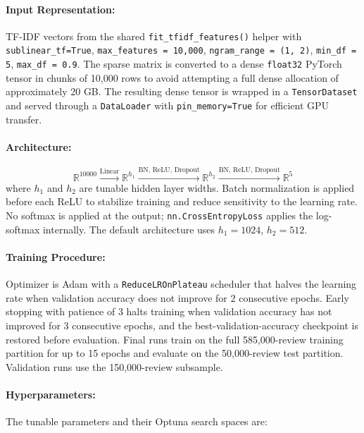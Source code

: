 \documentclass[12pt]{article}
\begin{document}
\paragraph{Input Representation:}
TF-IDF vectors from the shared \texttt{fit\_tfidf\_features()} helper with \texttt{sublinear\_tf=True}, \texttt{max\_features = 10{,}000}, \texttt{ngram\_range = (1, 2)}, \texttt{min\_df = 5}, \texttt{max\_df = 0.9}. The sparse matrix is converted to a dense \texttt{float32} PyTorch tensor in chunks of 10,000 rows to avoid attempting a full dense allocation of approximately 20 GB. The resulting dense tensor is wrapped in a \texttt{TensorDataset} and served through a \texttt{DataLoader} with \texttt{pin\_memory=True} for efficient GPU transfer.

\paragraph{Architecture:}
\[
\mathbb{R}^{10000} \xrightarrow{\text{Linear}} \mathbb{R}^{h_1} \xrightarrow{\text{BN, ReLU, Dropout}} \mathbb{R}^{h_2} \xrightarrow{\text{BN, ReLU, Dropout}} \mathbb{R}^{5}
\]
where $h_1$ and $h_2$ are tunable hidden layer widths. Batch normalization is applied before each ReLU to stabilize training and reduce sensitivity to the learning rate. No softmax is applied at the output; \texttt{nn.CrossEntropyLoss} applies the log-softmax internally. The default architecture uses $h_1 = 1024$, $h_2 = 512$.

\paragraph{Training Procedure:}
Optimizer is Adam with a \texttt{ReduceLROnPlateau} scheduler that halves the learning rate when validation accuracy does not improve for 2 consecutive epochs. Early stopping with patience of 3 halts training when validation accuracy has not improved for 3 consecutive epochs, and the best-validation-accuracy checkpoint is restored before evaluation. Final runs train on the full 585,000-review training partition for up to 15 epochs and evaluate on the 50,000-review test partition. Validation runs use the 150,000-review subsample.

\paragraph{Hyperparameters:}
The tunable parameters and their Optuna search spaces are:
\end{document}
